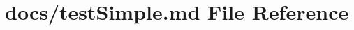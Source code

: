 \hypertarget{test_simple_8md}{}\section{docs/test\+Simple.md File Reference}
\label{test_simple_8md}
